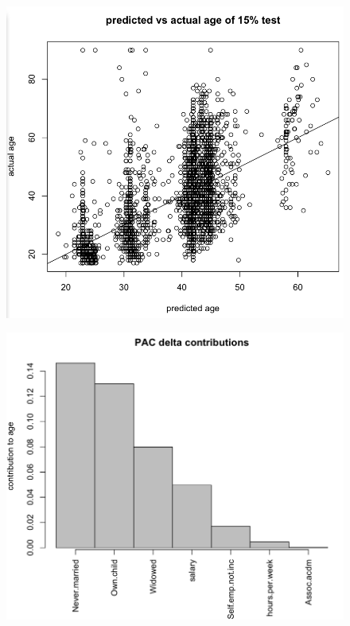 \documentclass{beamer}
\begin{document}
\begin{frame}
\begin{figure}
\includegraphics[scale=0.3]{figures/predVsActualCensus.png}
\label{fig:predVsActualCensus}
\end{figure}
\end{frame}

\begin{frame}

\begin{figure}
\includegraphics[scale=0.3]{figures/ageContrib.png}
\caption{}
 \label{fig:ageContrib}
\end{figure}

\end{frame}
\end{document}
